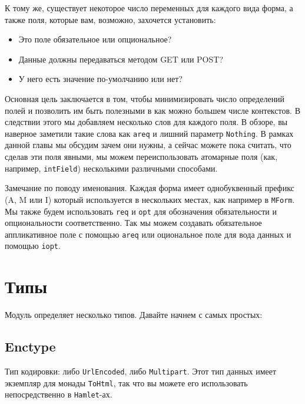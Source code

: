 К тому же, существует некоторое число переменных для каждого вида форма, а также поля,
которые вам, возможно, захочется установить:
\begin{itemize}
\item Это поле обязательное или опциональное?
\item Данные должны передаваться методом GET или POST?
\item У него есть значение по-умолчанию или нет?
\end{itemize}

Основная цель заключается в том, чтобы минимизировать число определений полей и позволить
им быть полезными в как можно большем числе контекстов. В следствии этого мы добавляем
несколько слов для каждого поля. В обзоре, вы наверное заметили такие слова как
\lstinline'areq' и лишний параметр \lstinline'Nothing'. В рамках данной главы мы обсудим 
зачем они нужны, а сейчас можете пока считать, что сделав эти поля явными, мы можем
переиспользовать атомарные поля (как, например, 
{\lstinline'intField'}) несколькими различными способами.

Замечание по поводу именования. Каждая форма имеет однобуквенный префикс (A, M или I)
который используется в нескольких местах, как например в \lstinline'MForm'. Мы также
будем использовать \lstinline'req' и \lstinline'opt' для обозначения обязательности и
опциональности соответственно. Так мы можем создавать обязательное аппликативное поле с
помощью \lstinline'areq' или оциональное поле для вода данных и помощью \lstinline'iopt'.

\section{Типы}

Модуль  определяет несколько типов. Давайте начнем с самых
простых:

\subsection{Enctype}
Тип кодировки: либо \lstinline'UrlEncoded', либо \lstinline'Multipart'. Этот тип данных
имеет экземпляр для монады \lstinline'ToHtml', так что вы можете его использовать
непосредственно в \lstinline'Hamlet'-ах.


